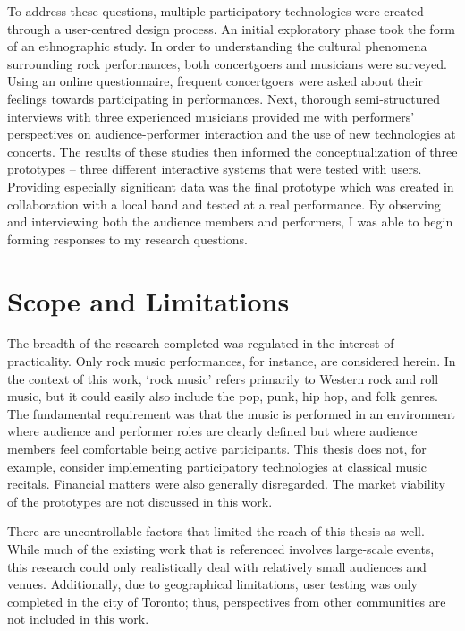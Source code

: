 To address these questions, multiple participatory technologies were created through a user-centred design process. An initial exploratory phase took the form of an ethnographic study. In order to understanding the cultural phenomena surrounding rock performances, both concertgoers and musicians were surveyed. Using an online questionnaire, frequent concertgoers were asked about their feelings towards participating in performances. Next, thorough semi-structured interviews with three experienced musicians provided me with performers' perspectives on audience-performer interaction and the use of new technologies at concerts. The results of these studies then informed the conceptualization of three prototypes -- three different interactive systems that were tested with users. Providing especially significant data was the final prototype which was created in collaboration with a local band and tested at a real performance. By observing and interviewing both the audience members and performers, I was able to begin forming responses to my research questions.


\section{Scope and Limitations}

The breadth of the research completed was regulated in the interest of practicality. Only rock music performances, for instance, are considered herein. In the context of this work, `rock music' refers primarily to Western rock and roll music, but it could easily also include the pop, punk, hip hop, and folk genres. The fundamental requirement was that the music is performed in an environment where audience and performer roles are clearly defined but where audience members feel comfortable being active participants. This thesis does not, for example, consider implementing participatory technologies at classical music recitals. Financial matters were also generally disregarded. The market viability of the prototypes are not discussed in this work.

There are uncontrollable factors that limited the reach of this thesis as well. While much of the existing work that is referenced involves large-scale events, this research could only realistically deal with relatively small audiences and venues. Additionally, due to geographical limitations, user testing was only completed in the city of Toronto; thus, perspectives from other communities are not included in this work.

